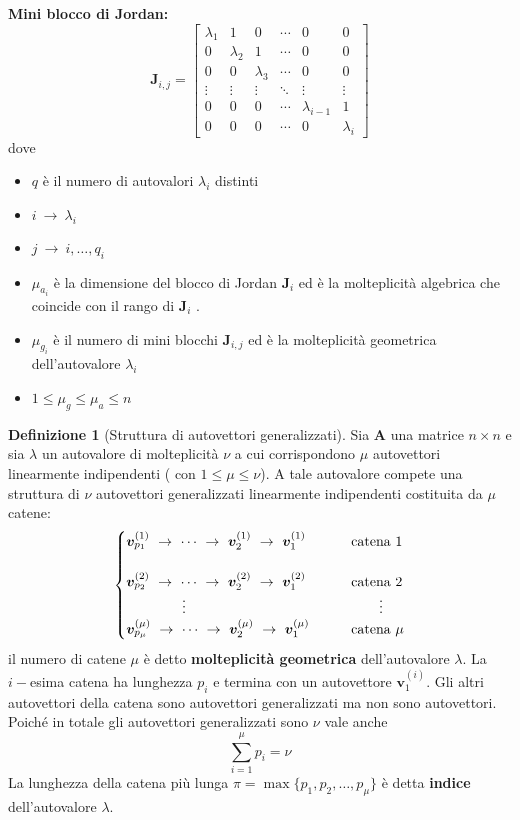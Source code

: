 \documentclass[a4paper]{article}
\renewcommand{\vec}{\bm}
\theoremstyle{definition}
\newtheorem{defn}{Definizione}[subsection]
\begin{document}
			\textbf{Mini blocco di Jordan:}
			\[
				\vec{J}_{i,j} =
				\begin{bmatrix}
					\lambda_1 & 1 & 0 & \cdots & 0 & 0 \\
					0 & \lambda_2 & 1 & \cdots & 0 & 0 \\
					0 & 0 & \lambda_3 & \cdots & 0 & 0 \\
					\vdots & \vdots & \vdots & \ddots & \vdots & \vdots \\
					0 & 0 & 0 & \cdots & \lambda_{i-1} & 1 \\
					0 & 0 & 0 & \cdots & 0 & \lambda_i
				\end{bmatrix}
			\]
			dove
			\begin{itemize}
				\item $ q $ è il numero di autovalori $ \lambda_i $ distinti
				\item $ i\ \rightarrow\ \lambda_i $
				\item $ j\ \rightarrow\ i,\dots, q_i $
				\item $ \mu_{a_i} $ è la dimensione del blocco di Jordan $ \vec{J}_i $ ed è la molteplicità algebrica che coincide con il rango di $ \vec{J}_i $ .
				\item $ \mu_{g_i} $ è il numero di mini blocchi $ \vec{J}_{i,j} $ ed è la molteplicità geometrica dell'autovalore $ \lambda_i $
				\item $ 1 \leq \mu_g \leq \mu_a \leq n $
			\end{itemize}
			
			\begin{defn}[Struttura di autovettori generalizzati]
				Sia $ \vec{A} $ una matrice $ n\times n $ e sia $ \lambda $ un autovalore di molteplicità $ \nu $ a cui corrispondono $ \mu $ autovettori linearmente indipendenti ( con $ 1\leq \mu \leq \nu $).
				A tale autovalore compete una struttura di $ \nu $ autovettori generalizzati linearmente indipendenti costituita da $ \mu $ catene:
				\[
					\begin{cases}
						\vec{v}_{p_1}^{(1)}\ \rightarrow\ \cdots \ \rightarrow\ \vec{v}_{2}^{(1)}\ \rightarrow\ \vec{v}_{1}^{(1)} \qquad & \textup{catena 1} \\ \\
						\vec{v}_{p_2}^{(2)}\ \rightarrow\ \cdots \ \rightarrow\ \vec{v}_{2}^{(2)}\ \rightarrow\ \vec{v}_{1}^{(2)} \qquad & \textup{catena 2} \\
						\qquad\qquad \vdots & \qquad \vdots \\
						\vec{v}_{p_\mu}^{(\mu)}\ \rightarrow\ \cdots \ \rightarrow\ \vec{v}_{2}^{(\mu)}\ \rightarrow\ \vec{v}_{1}^{(\mu)} \qquad & \textup{catena }\mu 
					\end{cases}
				\]
				il numero di catene $ \mu $ è detto \textbf{molteplicità geometrica} dell'autovalore $ \lambda $.
				La $ i-$esima catena ha lunghezza $ p_i $ e termina con un autovettore $ \vec{v}_1^{(i)} $. Gli altri autovettori della catena sono autovettori generalizzati ma non sono autovettori. Poiché in totale gli autovettori generalizzati sono $ \nu $ vale anche 
				\[
					\sum_{i=1}^{\mu} p_i = \nu
				\]
				La lunghezza della catena più lunga $ \pi = \max \{p_1,p_2,\dots,p_{\mu}\} $ è detta \textbf{indice} dell'autovalore $ \lambda $.
 			\end{defn}
 			
\end{document}
